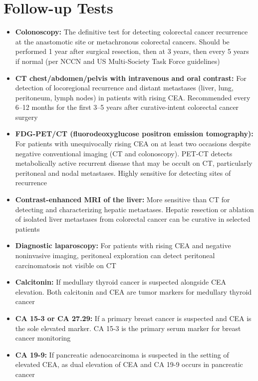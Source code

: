 \section*{Follow-up Tests}
\begin{itemize}
  \item \textbf{Colonoscopy:} The definitive test for detecting colorectal cancer recurrence at the anastomotic site or metachronous colorectal cancers. Should be performed 1 year after surgical resection, then at 3 years, then every 5 years if normal (per NCCN and US Multi-Society Task Force guidelines)
  \item \textbf{CT chest/abdomen/pelvis with intravenous and oral contrast:} For detection of locoregional recurrence and distant metastases (liver, lung, peritoneum, lymph nodes) in patients with rising CEA. Recommended every 6--12 months for the first 3--5 years after curative-intent colorectal cancer surgery
  \item \textbf{FDG-PET/CT (fluorodeoxyglucose positron emission tomography):} For patients with unequivocally rising CEA on at least two occasions despite negative conventional imaging (CT and colonoscopy). PET-CT detects metabolically active recurrent disease that may be occult on CT, particularly peritoneal and nodal metastases. Highly sensitive for detecting sites of recurrence
  \item \textbf{Contrast-enhanced MRI of the liver:} More sensitive than CT for detecting and characterizing hepatic metastases. Hepatic resection or ablation of isolated liver metastases from colorectal cancer can be curative in selected patients
  \item \textbf{Diagnostic laparoscopy:} For patients with rising CEA and negative noninvasive imaging, peritoneal exploration can detect peritoneal carcinomatosis not visible on CT
  \item \textbf{Calcitonin:} If medullary thyroid cancer is suspected alongside CEA elevation. Both calcitonin and CEA are tumor markers for medullary thyroid cancer
  \item \textbf{CA 15-3 or CA 27.29:} If a primary breast cancer is suspected and CEA is the sole elevated marker. CA 15-3 is the primary serum marker for breast cancer monitoring
  \item \textbf{CA 19-9:} If pancreatic adenocarcinoma is suspected in the setting of elevated CEA, as dual elevation of CEA and CA 19-9 occurs in pancreatic cancer
\end{itemize}

